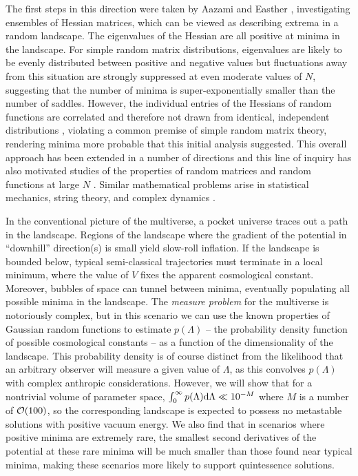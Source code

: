 \documentclass[12pt]{article}
\begin{document}
The first steps in this direction were taken by Aazami and Easther \cite{Aazami2006}, investigating ensembles of Hessian matrices, which can be viewed as describing extrema in a random landscape. The eigenvalues of the Hessian are all positive at minima in the landscape. For simple random matrix distributions, eigenvalues are likely to be evenly distributed between positive and negative values but fluctuations away from this situation are strongly suppressed at even moderate values of $N$, suggesting that the number of minima is super-exponentially smaller than the number of saddles. However, the individual entries of the Hessians of random functions are correlated and therefore not drawn from identical, independent distributions \cite{Battefeld2012,Easther2016}, violating a common premise of simple random matrix theory, rendering minima more probable that this initial analysis suggested.  This overall approach has been  extended in a number of directions \cite{Easther2006, Frazer2011, Henry2009, Marsh2013, Agarwal2011,Yang2012,Masoumi2016,Yamada2018} and this line of inquiry has also motivated studies of the properties of random matrices and random functions at large $N$ \cite{Bray2007,Dean2008,Majumdar2009,Bachlechner2014,Battefeld2012,Fyodorov2013,Masoumi2017}. Similar mathematical problems arise in statistical mechanics, string theory, and complex dynamics \cite{Fyodorov2004,Douglas2004,Douglas2006,Fyodorov2007,Fyodorov2012,Fyodorov2018,Ros2019}.

 
In the conventional picture of the multiverse, a pocket universe traces out a path in the landscape. Regions of the landscape where the gradient of the potential in ``downhill'' direction(s) is small yield slow-roll inflation. If the landscape is bounded below, typical semi-classical trajectories must terminate in a local minimum, where the value of $V$ fixes the apparent cosmological constant. Moreover, bubbles of space can tunnel between minima, eventually populating all possible minima in the landscape.  The {\em measure problem\/} for the multiverse is notoriously complex, but in this scenario we can use the known properties of Gaussian random functions to estimate $p(\Lambda)$ -- the probability density function of possible cosmological constants -- as a function of the dimensionality of the landscape.  This probability density is of course distinct from the likelihood that an arbitrary observer will measure a given value of $\Lambda$, as this convolves $p(\Lambda)$ with complex anthropic considerations. However, we will show that for a nontrivial volume of parameter space,  $\int_0^\infty  p(\Lambda) {\rm d}\Lambda \ll 10^{-M}$  where $M$ is a number of ${\cal{O}}(100)$, so the corresponding landscape is expected to possess no metastable solutions with  positive vacuum energy. We also find that in scenarios where positive minima are extremely rare, the smallest second derivatives of the potential at these rare minima will be much smaller than those found near typical minima, making these scenarios more likely to support quintessence solutions.
\end{document}

